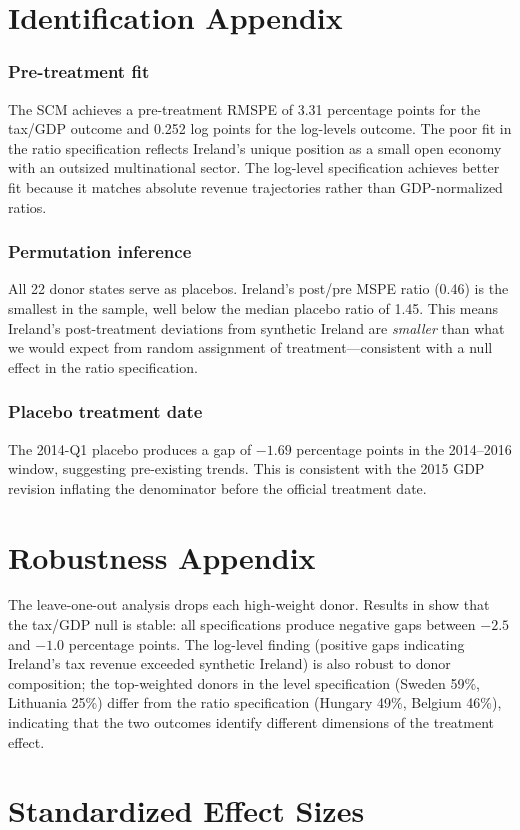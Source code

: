 \documentclass[12pt]{article}
\begin{document}
\section{Identification Appendix}

\subsubsection*{Pre-treatment fit} The SCM achieves a pre-treatment RMSPE of 3.31 percentage points for the tax/GDP outcome and 0.252 log points for the log-levels outcome. The poor fit in the ratio specification reflects Ireland's unique position as a small open economy with an outsized multinational sector. The log-level specification achieves better fit because it matches absolute revenue trajectories rather than GDP-normalized ratios.

\subsubsection*{Permutation inference} All 22 donor states serve as placebos. Ireland's post/pre MSPE ratio (0.46) is the smallest in the sample, well below the median placebo ratio of 1.45. This means Ireland's post-treatment deviations from synthetic Ireland are \textit{smaller} than what we would expect from random assignment of treatment---consistent with a null effect in the ratio specification.

\subsubsection*{Placebo treatment date} The 2014-Q1 placebo produces a gap of $-1.69$ percentage points in the 2014--2016 window, suggesting pre-existing trends. This is consistent with the 2015 GDP revision inflating the denominator before the official treatment date.

\section{Robustness Appendix}

The leave-one-out analysis drops each high-weight donor. Results in  show that the tax/GDP null is stable: all specifications produce negative gaps between $-2.5$ and $-1.0$ percentage points. The log-level finding (positive gaps indicating Ireland's tax revenue exceeded synthetic Ireland) is also robust to donor composition; the top-weighted donors in the level specification (Sweden 59\%, Lithuania 25\%) differ from the ratio specification (Hungary 49\%, Belgium 46\%), indicating that the two outcomes identify different dimensions of the treatment effect.

\section{Standardized Effect Sizes}
\label{sec:sde}


\end{document}
